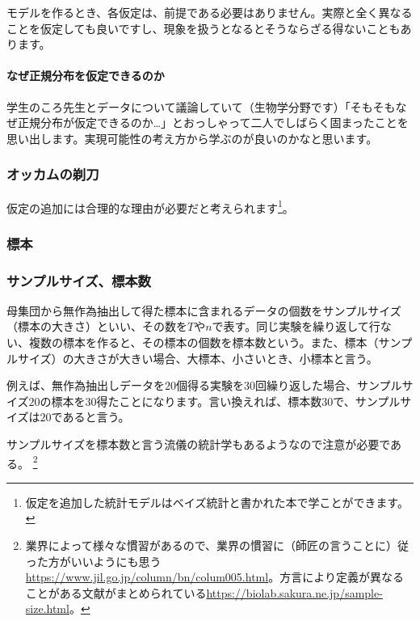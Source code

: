モデルを作るとき、各仮定は、前提である必要はありません。実際と全く異なることを仮定しても良いですし、現象を扱うとなるとそうならざる得ないこともあります。

\begin{mybox}
        \paragraph{なぜ正規分布を仮定できるのか}
            学生のころ先生とデータについて議論していて（生物学分野です）「そもそもなぜ正規分布が仮定できるのか…」とおっしゃって二人でしばらく固まったことを思い出します。実現可能性の考え方から学ぶのが良いのかなと思います。
\end{mybox}


\subsubsection{オッカムの剃刀}

仮定の追加には合理的な理由が必要だと考えられます\footnote{仮定を追加した統計モデルはベイズ統計と書かれた本で学ことができます。}。

\begin{figure}
    \begin{center}
%
\end{center}
\end{figure}

\subsubsection{標本}


\subsubsection{サンプルサイズ、標本数}
\begin{defi}
母集団から無作為抽出して得た標本に含まれるデータの個数をサンプルサイズ（標本の大きさ）といい、その数を$T$や$n$で表す。同じ実験を繰り返して行ない、複数の標本を作ると、その標本の個数を標本数という。また、標本（サンプルサイズ）の大きさが大きい場合、大標本、小さいとき、小標本と言う。
\end{defi}
例えば、無作為抽出しデータを$20$個得る実験を30回繰り返した場合、サンプルサイズ$20$の標本を$30$得たことになります。言い換えれば、標本数$30$で、サンプルサイズは$20$であると言う。

サンプルサイズを標本数と言う流儀の統計学もあるようなので注意が必要である。
\footnote{ 業界によって様々な慣習があるので、業界の慣習に（師匠の言うことに）従った方がいいようにも思う\url{https://www.jil.go.jp/column/bn/colum005.html}。方言により定義が異なることがある文献がまとめられている\url{https://biolab.sakura.ne.jp/sample-size.html}。}


